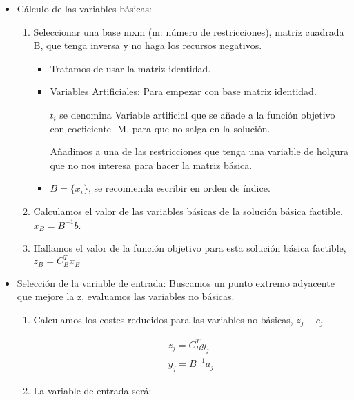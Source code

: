 \documentclass[12pt, twoside, openright]{report} %
\begin{document}
\begin{itemize}
	\item Cálculo de las variables básicas:

	      \begin{enumerate}
		      \def\labelenumi{\arabic{enumi}.}
		      \item Seleccionar una base mxm (m: número de restricciones), matriz
		            cuadrada B, que tenga inversa y no haga los recursos negativos.

		            \begin{itemize}
			            \item Tratamos de usar la matriz identidad.
			            \item Variables Artificiales: Para empezar con base matriz
			                  identidad.

			                  \(t_i\) se denomina Variable artificial que se añade a la
			                  función objetivo con coeficiente -M, para que no salga en la
			                  solución.

			                  Añadimos a una de las restricciones que tenga una variable
			                  de holgura que no nos interesa para hacer la matriz básica.
			            \item \(B = \{ x_i \}\), se recomienda escribir en orden de índice.
		            \end{itemize}
		      \item Calculamos el valor de las variables básicas de la solución
		            básica factible, \(x_B=B^{-1}b\).
		      \item Hallamos el valor de la función objetivo para esta solución
		            básica factible, \(z_B=C_B^Tx_B\)
	      \end{enumerate}
	\item Selección de la variable de entrada: Buscamos un punto extremo
	      adyacente que mejore la z, evaluamos las variables no básicas.

	      \begin{enumerate}
		      \def\labelenumi{\arabic{enumi}.}
		      \item Calculamos los costes reducidos para las variables no básicas,
		            \(z_j-c_j\)

		            $$\begin{matrix}
				            z_j=C_B^Ty_j  \\
				            y_j=B^{-1}a_j
			            \end{matrix}$$
		      \item La variable de entrada será:


\end{enumerate}
\end{itemize}
\end{document}
